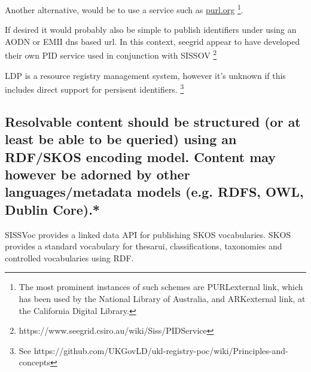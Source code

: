 \documentclass[10pt,a4paper]{article}
\begin{document}
\begin{flushleft}
  \item[]Another alternative, would be to use a service such as \url{purl.org}  \footnote{ The most
  prominent instances of such schemes are PURLexternal link, which has been used
  by the National Library of Australia, and ARKexternal link, at the California
  Digital Library.  }. 

  \item[]If desired it would probably also be simple to publish identifiers under using an
  AODN or EMII dns based url. In this context, seegrid appear to have developed their own
  PID service used in conjunction with SISSOV  \footnote{
  https://www.seegrid.csiro.au/wiki/Siss/PIDService}  
  
  \item[]LDP is a resource registry management system, however it's unknown 
  if this includes direct support for persisent identifiers.
    \footnote{ See 
    https://github.com/UKGovLD/ukl-registry-poc/wiki/Principles-and-concepts
  }


% 


% 
%   
% 
% 
% 


\subsection{Resolvable content should be structured (or at least be able to be queried)
  using an RDF/SKOS encoding model. Content may however be adorned by other
  languages/metadata models (e.g. RDFS, OWL, Dublin Core).* }

  SISSVoc provides a linked data API for publishing SKOS vocabularies.  SKOS
provides a standard vocabulary for thesarui, classifications, taxonomies and
controlled vocabularies using RDF.


\end{flushleft}
\end{document}
